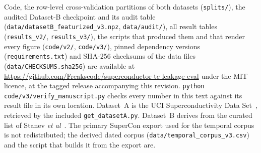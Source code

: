 \documentclass{iopjournal}
\newcommand{\etal}{\textit{et al}}
\begin{document}
Code, the row-level cross-validation partitions of both datasets (\texttt{splits/}), the audited
Dataset-B checkpoint and its audit table (\texttt{data/datasetB\_featurized\_v3.npz},
\texttt{data/audit/}), all result tables (\texttt{results\_v2/}, \texttt{results\_v3/}), the scripts
that produced them and that render every figure (\texttt{code/v2/}, \texttt{code/v3/}), pinned
dependency versions (\texttt{requirements.txt}) and SHA-256 checksums of the data files
(\texttt{data/CHECKSUMS.sha256}) are available at
\url{https://github.com/Freakscode/superconductor-tc-leakage-eval} under the MIT licence, at the
tagged release accompanying this revision. \texttt{python code/v3/verify\_manuscript.py} checks
every number in this text against its result file in its own location. Dataset~A is the UCI
Superconductivity Data Set~\cite{hamidieh2018}, retrieved by the included \texttt{get\_datasetA.py}.
Dataset~B derives from the curated list of Stanev \etal~\cite{stanev2018}. The primary SuperCon
export used for the temporal corpus is not redistributed; the derived dated corpus
(\texttt{data/temporal\_corpus\_v3.csv}) and the script that builds it from the export are.
\end{document}
